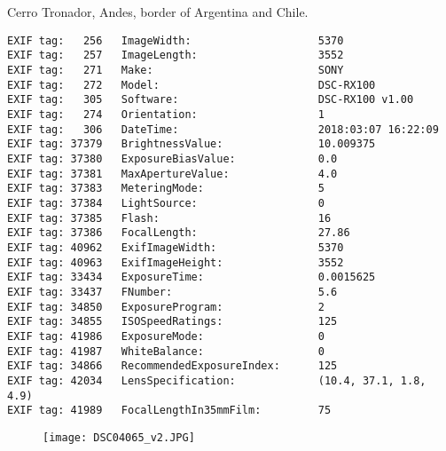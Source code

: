 \section{\protect{}}
\noindent Cerro Tronador, Andes, border of Argentina and Chile.
\noindent
\begin{lstlisting}
EXIF tag:   256   ImageWidth:                    5370
EXIF tag:   257   ImageLength:                   3552
EXIF tag:   271   Make:                          SONY
EXIF tag:   272   Model:                         DSC-RX100
EXIF tag:   305   Software:                      DSC-RX100 v1.00
EXIF tag:   274   Orientation:                   1
EXIF tag:   306   DateTime:                      2018:03:07 16:22:09
EXIF tag: 37379   BrightnessValue:               10.009375
EXIF tag: 37380   ExposureBiasValue:             0.0
EXIF tag: 37381   MaxApertureValue:              4.0
EXIF tag: 37383   MeteringMode:                  5
EXIF tag: 37384   LightSource:                   0
EXIF tag: 37385   Flash:                         16
EXIF tag: 37386   FocalLength:                   27.86
EXIF tag: 40962   ExifImageWidth:                5370
EXIF tag: 40963   ExifImageHeight:               3552
EXIF tag: 33434   ExposureTime:                  0.0015625
EXIF tag: 33437   FNumber:                       5.6
EXIF tag: 34850   ExposureProgram:               2
EXIF tag: 34855   ISOSpeedRatings:               125
EXIF tag: 41986   ExposureMode:                  0
EXIF tag: 41987   WhiteBalance:                  0
EXIF tag: 34866   RecommendedExposureIndex:      125
EXIF tag: 42034   LensSpecification:             (10.4, 37.1, 1.8, 4.9)
EXIF tag: 41989   FocalLengthIn35mmFilm:         75

\end{lstlisting}
\clearpage
\begin{figure}
\raggedleft
\texttt{[image: DSC04065\_v2.JPG]}
\end{figure}


\clearpage

